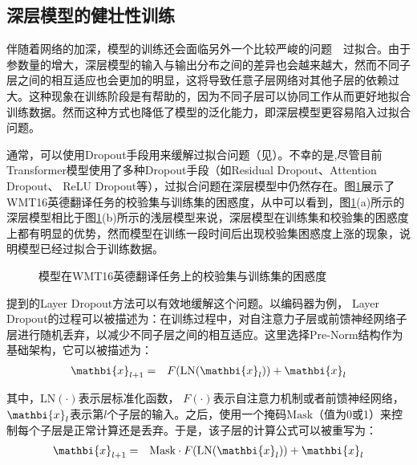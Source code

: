 
\subsection{深层模型的健壮性训练}


\parinterval 伴随着网络的加深，模型的训练还会面临另外一个比较严峻的问题\ \dash \ 过拟合。由于参数量的增大，深层模型的输入与输出分布之间的差异也会越来越大，然而不同子层之间的相互适应也会更加的明显，这将导致任意子层网络对其他子层的依赖过大。这种现象在训练阶段是有帮助的，因为不同子层可以协同工作从而更好地拟合训练数据。然而这种方式也降低了模型的泛化能力，即深层模型更容易陷入过拟合问题。

\parinterval 通常，可以使用Dropout手段用来缓解过拟合问题（见{\chapterthirteen}）。不幸的是,尽管目前Transformer模型使用了多种Dropout手段（如Residual Dropout、Attention Dropout、 ReLU Dropout等），过拟合问题在深层模型中仍然存在。图\ref{fig:15-18}展示了WMT16英德翻译任务的校验集与训练集的困惑度，从中可以看到，图\ref{fig:15-18}(a)所示的深层模型相比于图\ref{fig:15-18}(b)所示的浅层模型来说，深层模型在训练集和校验集的困惑度上都有明显的优势，然而模型在训练一段时间后出现校验集困惑度上涨的现象，说明模型已经过拟合于训练数据。

\begin{figure}[htp]
\centering

\caption{模型在WMT16英德翻译任务上的校验集与训练集的困惑度}
\label{fig:15-18}
\end{figure}

\parinterval {\chapterthirteen}提到的Layer Dropout方法可以有效地缓解这个问题。以编码器为例， Layer Dropout的过程可以被描述为：在训练过程中，对自注意力子层或前馈神经网络子层进行随机丢弃，以减少不同子层之间的相互适应。这里选择Pre-Norm结构作为基础架构，它可以被描述为：
\begin{eqnarray}
\mathbi{x}_{l+1} &=& F(\textrm{LN}(\mathbi{x}_l)) + \mathbi{x}_l
\label{eq:15-51}
\end{eqnarray}

\noindent 其中，$\textrm{LN}( \cdot )$表示层标准化函数， $F( \cdot )$表示自注意力机制或者前馈神经网络，$\mathbi{x}_l$表示第$l$个子层的输入。之后，使用一个掩码$\textrm{Mask}$（值为0或1）来控制每个子层是正常计算还是丢弃。于是，该子层的计算公式可以被重写为：
\begin{eqnarray}
\mathbi{x}_{l+1} &=& \textrm{Mask} \cdot F(\textrm{LN}(\mathbi{x}_l))+\mathbi{x}_l
\label{eq:15-52}
\end{eqnarray}

